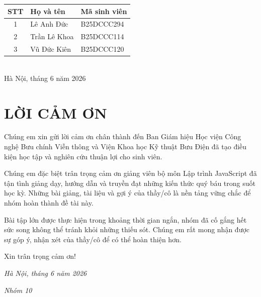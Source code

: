 \documentclass[12pt,a4paper]{article}
\begin{document}
\begin{titlepage}
\begin{center}
\begin{tabular}{|c|l|l|}
\hline
\textbf{STT} & \textbf{Họ và tên} & \textbf{Mã sinh viên} \\
\hline
1 & Lê Anh Đức   & B25DCCC294 \\
\hline
2 & Trần Lê Khoa & B25DCCC114  \\
\hline
3 & Vũ Đức Kiên  & B25DCCC120 \\
\hline
\end{tabular}\\[16pt]

\vfill
{\large Hà Nội, tháng 6 năm 2026}

\end{center}
\end{titlepage}
\newpage
\section*{LỜI CẢM ƠN}

Chúng em xin gửi lời cảm ơn chân thành đến Ban Giám hiệu Học viện Công nghệ Bưu chính Viễn thông và Viện Khoa học Kỹ thuật Bưu Điện đã tạo điều kiện học tập và nghiên cứu thuận lợi cho sinh viên.

Chúng em đặc biệt trân trọng cảm ơn giảng viên bộ môn Lập trình JavaScript đã tận tình giảng dạy, hướng dẫn và truyền đạt những kiến thức quý báu trong suốt học kỳ. Những bài giảng, tài liệu và gợi ý của thầy/cô là nền tảng vững chắc để nhóm hoàn thành đề tài này.

Bài tập lớn được thực hiện trong khoảng thời gian ngắn, nhóm đã cố gắng hết sức song không thể tránh khỏi những thiếu sót. Chúng em rất mong nhận được sự góp ý, nhận xét của thầy/cô để có thể hoàn thiện hơn.

Xin trân trọng cảm ơn!

\bigskip
\hfill\textit{Hà Nội, tháng 6 năm 2026}

\hfill\textit{Nhóm 10}

\newpage
\tableofcontents

\newpage
{}
\setcounter{page}{1}
\end{document}
